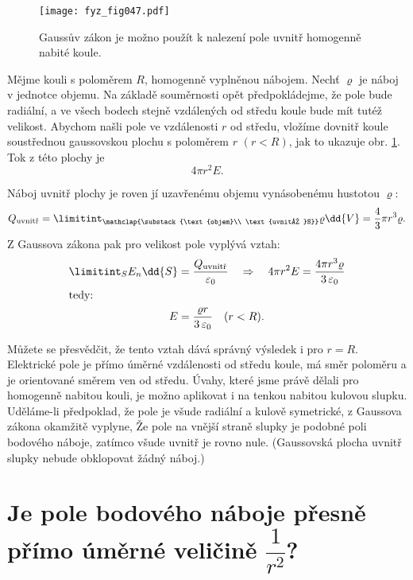   \begin{figure}[ht!]  %
    \centering
    \texttt{[image: fyz\_fig047.pdf]}
    \caption{Gaussův zákon je možno použít k nalezení pole uvnitř homogenně nabité koule.}
    \label{fyz:fig047}
  \end{figure}
  Mějme kouli s poloměrem \(R\), homogenně vyplněnou nábojem. Nechť \(\varrho\) je náboj v jednotce
  objemu. Na základě souměrnosti opět předpokládejme, že pole bude radiální, a ve všech bodech
  stejně vzdálených od středu koule bude mít tutéž velikost. Abychom našli pole ve vzdálenosti \(r\)
  od středu, vložíme dovnitř koule soustřednou gaussovskou plochu s poloměrem \(r\) \((r< R)\), jak
  to ukazuje obr. \ref{fyz:fig047}. Tok z této plochy je 
  \[4\pi r^2E.\]

  Náboj uvnitř plochy je roven jí uzavřenému objemu vynásobenému hustotou \(\varrho\):
  \begin{equation}\label{fyz:eq_fey_elstat_gauss05} 
    Q_{\text{uvnitř}} 
            = \limitint_{\mathclap{\substack{\text{objem}\\
                                             \text{uvnitř }S}}} \varrho\dd{V} 
            = \frac{4}{3}\pi r^3\varrho.           
  \end{equation}
  Z Gaussova zákona pak pro velikost pole vyplývá vztah:
  \begin{align}      
   \limitint_S E_n\dd{S}
      &= \frac{Q_{\text{uvnitř}}}{\varepsilon_0} 
            \quad\Rightarrow\quad 4\pi r^2E 
            = \frac{4\pi r^3\varrho}{3\,\varepsilon_0}  \label{fyz:eq_fey_elstat_gauss06} \\ 
   \shortintertext{tedy:}
   E  &= \frac{\varrho r}{3\,\varepsilon_0} \quad (r<R).
  \end{align}
  
  Můžete se přesvědčit, že tento vztah dává správný výsledek i pro \(r=R\). Elektrické pole je přímo
  úměrné vzdálenosti od středu koule, má směr poloměru a je orientované směrem ven od středu. Úvahy,
  které jsme právě dělali pro homogenně nabitou kouli, je možno aplikovat i na tenkou nabitou
  kulovou slupku. Uděláme-li předpoklad, že pole je všude radiální a kulově symetrické, z Gaussova
  zákona okamžitě vyplyne, Že pole na vnější straně slupky je podobné poli bodového náboje, zatímco
  všude uvnitř je rovno nule. (Gaussovská plocha uvnitř slupky nebude obklopovat žádný náboj.)
  
\section{Je pole bodového náboje přesně přímo úměrné veličině 
             \texorpdfstring{\fontsize{8pt}{9pt}\selectfont\(\dfrac{1}{r^2}\)}{1/r^2}?}\label{fyz:IIchapVsecVII}
              
